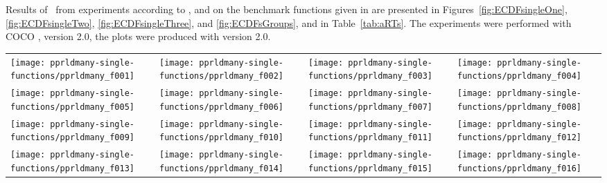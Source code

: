 \documentclass[sigconf]{acmart}
\newcommand{\change}[1]{{\color{red} #1}}
\begin{document}
Results of \algname\ from experiments according to \cite{hansen2016exp}, \cite{hansen2016perfass} and \cite{biobj2016perfass} on the benchmark
functions given in \cite{biobj2016func} are presented in
Figures~\ref{fig:ECDFsingleOne}, \ref{fig:ECDFsingleTwo}, \ref{fig:ECDFsingleThree}, and \ref{fig:ECDFsGroups}, and in
Table~\ref{tab:aRTs}. The experiments were performed with COCO \cite{hansen2016cocoplat}, version \change{2.0}, the plots were produced with version \change{2.0}.



\begin{figure*}
\centering
\begin{tabular}{@{\hspace*{-0.018\textwidth}}l@{\hspace*{-0.02\textwidth}}l@{\hspace*{-0.02\textwidth}}l@{\hspace*{-0.02\textwidth}}l@{\hspace*{-0.02\textwidth}}}
\texttt{[image: pprldmany-single-functions/pprldmany\_f001]}&
\texttt{[image: pprldmany-single-functions/pprldmany\_f002]}&
\texttt{[image: pprldmany-single-functions/pprldmany\_f003]}&
\texttt{[image: pprldmany-single-functions/pprldmany\_f004]}\\[-1.8ex]
\texttt{[image: pprldmany-single-functions/pprldmany\_f005]}&
\texttt{[image: pprldmany-single-functions/pprldmany\_f006]}&
\texttt{[image: pprldmany-single-functions/pprldmany\_f007]}&
\texttt{[image: pprldmany-single-functions/pprldmany\_f008]}\\[-1.8ex]
\texttt{[image: pprldmany-single-functions/pprldmany\_f009]}&
\texttt{[image: pprldmany-single-functions/pprldmany\_f010]}&
\texttt{[image: pprldmany-single-functions/pprldmany\_f011]}&
\texttt{[image: pprldmany-single-functions/pprldmany\_f012]}\\[-1.8ex]
\texttt{[image: pprldmany-single-functions/pprldmany\_f013]}&
\texttt{[image: pprldmany-single-functions/pprldmany\_f014]}&
\texttt{[image: pprldmany-single-functions/pprldmany\_f015]}&
\texttt{[image: pprldmany-single-functions/pprldmany\_f016]}\\[-1.8ex]
\end{tabular}
 \caption{\label{fig:ECDFsingleOne}
}

\end{figure*}
\end{document}
